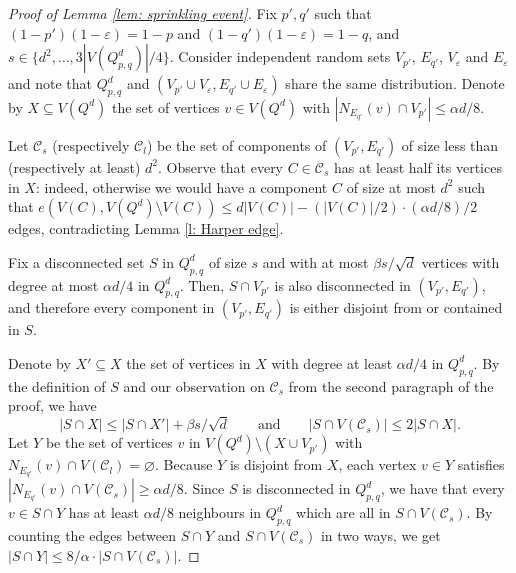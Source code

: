 \documentclass{article}
\theoremstyle{definition}
\newcommand{\eps}{\varepsilon}
\newcommand{\cC}{\mathcal{C}}
\begin{document}
\begin{proof}[Proof of Lemma \ref{lem: sprinkling event}]
Fix $p',q'$ such that $(1-p')(1-\eps)=1-p$ and $(1-q')(1-\eps)=1-q$, and $s\in \{d^2,\ldots, 3|V(Q^d_{p,q})|/4\}$. Consider independent random sets $V_{p'}$, $E_{q'}$, $V_{\eps}$ and $E_{\eps}$ and note that $Q^d_{p,q}$ and $(V_{p'}\cup V_{\eps},E_{q'}\cup E_{\eps})$ share the same distribution.
Denote by $X\subseteq V(Q^d)$ the set of vertices $v\in V(Q^d)$ with $|N_{E_{q'}}(v)\cap V_{p'}|\le \alpha d/8$. 

Let $\cC_s$ (respectively $\cC_l$) be the set of components of $(V_{p'},E_{q'})$ of size less than (respectively at least) $d^2$. 
Observe that every $C\in \cC_s$ has at least half its vertices in $X$: indeed, otherwise we would have a component $C$ of size at most $d^2$ such that $e(V(C),V(Q^d)\setminus V(C))\le d|V(C)|-(|V(C)|/2)\cdot (\alpha d/8)/2$
edges, contradicting Lemma \ref{l: Harper edge}.

Fix a disconnected set $S$ in $Q^d_{p,q}$ of size $s$ and with at most $\beta s/\sqrt{d}$ vertices with degree at most $\alpha d/4$ in $Q^d_{p,q}$.
Then, $S\cap V_{p'}$ is also disconnected in $(V_{p'},E_{q'})$, and therefore every component in $(V_{p'},E_{q'})$ is either disjoint from or contained in $S$. 

Denote by $X'\subseteq X$ the set of vertices in $X$ with degree at least $\alpha d/4$ in $Q^d_{p,q}$. 
By the definition of $S$ and our observation on $\cC_s$ from the second paragraph of the proof, we have
\begin{equation}\label{eq:snd}
|S\cap X|\le |S\cap X'|+\beta s/\sqrt{d}\qquad \text{and}\qquad |S\cap V(\cC_s)|\le 2|S\cap X|.
\end{equation}
Let $Y$ be the set of vertices $v$ in $V(Q^d)\setminus(X\cup V_{p'})$ with $N_{E_{q'}}(v)\cap V(\cC_l)=\varnothing$. 
Because $Y$ is disjoint from $X$, each vertex $v\in Y$ satisfies $|N_{E_{q'}}(v)\cap V(\cC_s)|\geq \alpha d/8$. Since $S$ is disconnected in $Q^d_{p,q}$, we have that every $v\in S\cap Y$ has at least $\alpha d/8$ neighbours in $Q^d_{p,q}$ which are all in $S\cap V(\cC_s)$. By counting the edges between $S\cap Y$ and $S\cap V(\cC_s)$ in two ways, we get $|S\cap Y|\leq 8/\alpha\cdot |S\cap V(\cC_s)|$. 


\end{proof}
\end{document}
